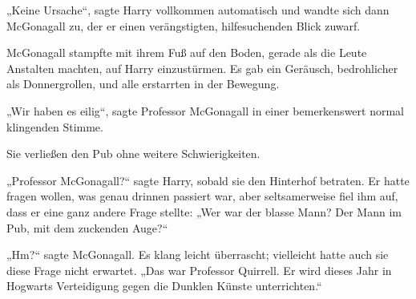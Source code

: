„Keine Ursache“, sagte Harry vollkommen automatisch und wandte sich dann McGonagall zu, der er einen verängstigten, hilfesuchenden Blick zuwarf.

McGonagall stampfte mit ihrem Fuß auf den Boden, gerade als die Leute Anstalten machten, auf Harry einzustürmen. Es gab ein Geräusch, bedrohlicher als Donnergrollen, und alle erstarrten in der Bewegung.

„Wir haben es eilig“, sagte Professor McGonagall in einer bemerkenswert normal klingenden Stimme.

Sie verließen den Pub ohne weitere Schwierigkeiten.

„Professor McGonagall?“ sagte Harry, sobald sie den Hinterhof betraten. Er hatte fragen wollen, was genau drinnen passiert war, aber seltsamerweise fiel ihm auf, dass er eine ganz andere Frage stellte:
„Wer war der blasse Mann? Der Mann im Pub, mit dem zuckenden Auge?“

„Hm?“ sagte McGonagall. Es klang leicht überrascht; vielleicht hatte auch sie diese Frage nicht erwartet.
„Das war Professor Quirrell. Er wird dieses Jahr in Hogwarts Verteidigung gegen die Dunklen Künste unterrichten.“

